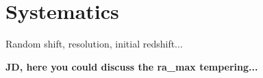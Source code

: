 \section{Systematics}
Random shift, resolution, initial redshift...

{\bf JD, here you could discuss the ra\_max tempering...}
